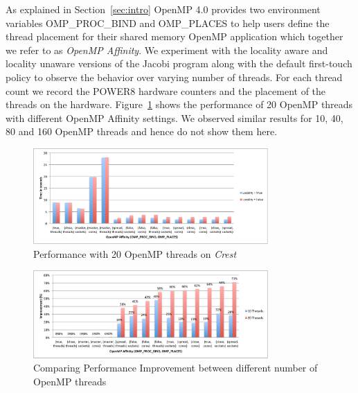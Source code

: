 As explained in Section~\ref{sec:intro} OpenMP 4.0 provides two environment variables OMP\_PROC\_BIND and OMP\_PLACES to help users define the thread placement for their shared memory OpenMP application which together we refer to as \textit{OpenMP Affinity}.%
%
 We experiment with the locality aware and locality unaware versions of the Jacobi program along with the default first-touch policy to observe the behavior over varying number of threads. 
 For each thread count we record the POWER8 hardware counters and the placement of the threads on the hardware. 
 Figure~\ref{fig:20th} shows the performance of 20 OpenMP threads with different OpenMP Affinity settings. We observed similar results for 10, 40, 80 and 160 OpenMP threads and hence do not show them here.
%
\begin{figure}[h!]
  \centering
  \includegraphics[height=0.4\textwidth, width=0.8\textwidth]{./Images/20Perf.pdf}
       \caption{Performance with 20 OpenMP threads on \textit{Crest}}
       \label{fig:20th}
\end{figure}
%
\begin{figure}[h!]
  \centering
  \includegraphics[height=0.4\textwidth, width=0.8\textwidth]{./Images/PerfI.pdf}
       \caption{Comparing Performance Improvement between different number of OpenMP threads}
       \label{fig:imp}
\end{figure}

